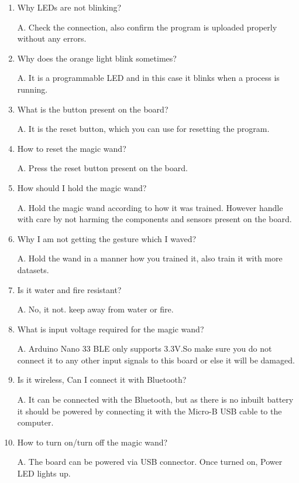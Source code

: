 \begin{enumerate}
    
    \item Why LEDs are not blinking?
    
    A. Check the connection, also confirm the program is uploaded properly without any errors.
    
    \item Why does the orange light blink sometimes?
    
    A. It is a programmable LED and in this case it blinks when a process is running.
    
    \item What is the button present on the board?
    
    A. It is the reset button, which you can use for resetting the program. 
    
    \item How to reset the magic wand?
    
    A. Press the reset button present on the board. 
    
    \item How should I hold the magic wand?
    
    A. Hold the magic wand according to how it was trained. However handle with care by not harming the components and sensors present on the board.
    
    \item Why I am not getting the gesture which I waved?
    
    A. Hold the wand in a manner how you trained it, also train it with more datasets.
    
    \item Is it water and fire resistant?
    
    A. No, it not. keep away from water or fire.
    
    \item What is input voltage required for the magic wand?
    
    A. Arduino Nano 33 BLE only supports 3.3V.So make sure you do not connect it to any other input signals to this board or else it will be damaged. 
    
    \item Is it wireless, Can I connect it with Bluetooth?
    
    A. It can be connected with the Bluetooth, but as there is no inbuilt battery it should be powered by connecting it with the Micro-B USB cable to the computer.
    
    \item How to turn on/turn off the magic wand?
    
    A. The board can be powered via USB connector. Once turned on, Power LED lights up.
    
\end{enumerate}

